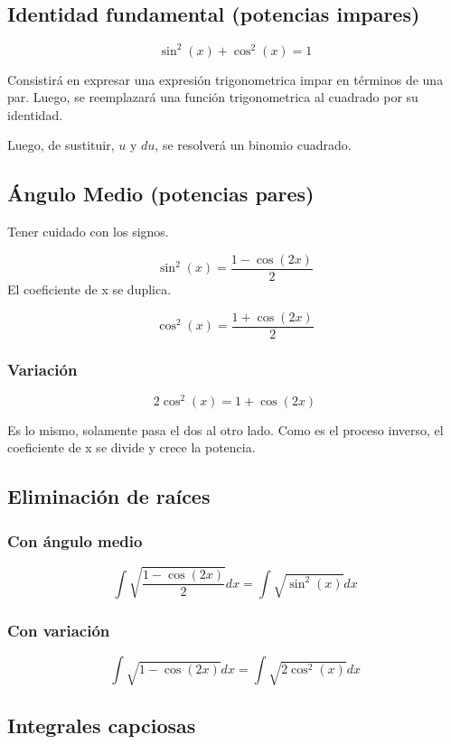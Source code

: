 \documentclass[11pt]{article}
\begin{document}
\begin{multicols}{3}
\subsection{Identidad fundamental (potencias impares)}
\label{sec-2-2}
\[\sin^2(x) + \cos^2(x) = 1\]

Consistirá en expresar una expresión trigonometrica impar en términos de una par.
Luego, se reemplazará una función trigonometrica al cuadrado por su identidad.

Luego, de sustituir, \(u\) y \(du\), se resolverá un binomio cuadrado.







\subsection{Ángulo Medio (potencias pares)}
\label{sec-2-3}

Tener cuidado con los signos.

\[\sin^2(x) = \frac{1 - \cos(2x)}{2}  \]
El coeficiente de x se duplica.

\[\cos^2(x) = \frac{1 + \cos(2x)}{2}  \]

\subsubsection{Variación}
\label{sec-2-3-1}

\[2\cos^2(x) = 1 + \cos(2x) \]

Es lo mismo, solamente pasa el dos al otro lado.
Como es el proceso inverso, el coeficiente de x se divide 
y crece la potencia. 

\subsection{Eliminación de raíces}
\label{sec-2-4}
\subsubsection{Con ángulo medio}
\label{sec-2-4-1}

\[\int \sqrt{\frac{1 - \cos(2x)}{2}} dx = \int \sqrt{\sin^2(x)}dx \]

\subsubsection{Con variación}
\label{sec-2-4-2}
\[\int \sqrt{1 - \cos(2x)} dx = \int \sqrt{2\cos^2(x)}dx \]
\subsection{Integrales capciosas}
\label{sec-2-5}



\end{multicols}
\end{document}
